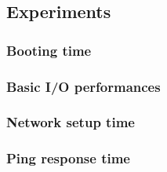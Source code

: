 \subsection{Experiments} \label{subs:experiments}

\subsubsection{Booting time}

\subsubsection{Basic I/O performances}

\subsubsection{Network setup time}

\subsubsection{Ping response time}
